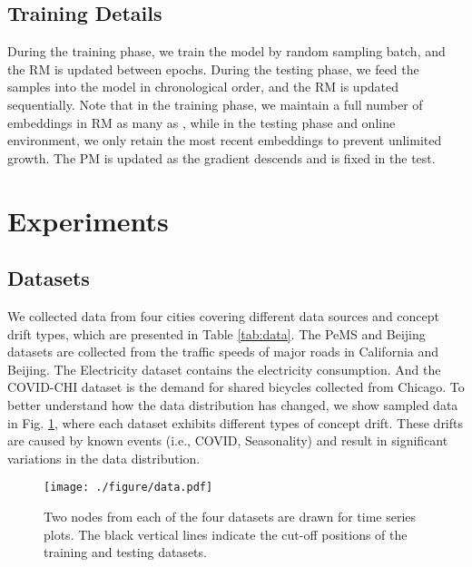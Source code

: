 \documentclass[sigconf]{acmart}
\begin{document}
\subsection{Training Details}
During the training phase, we train the model by random sampling batch, and the RM is updated between epochs. During the testing phase, we feed the samples into the model in chronological order, and the RM is updated sequentially. Note that in the training phase, we maintain a full number of embeddings in RM as many as , while in the testing phase and online environment, we only retain the most recent  embeddings to prevent unlimited growth. The PM is updated as the gradient descends and is fixed in the test.

\section{Experiments}

\begin{table}[h]
    \centering
	\caption{Summary of Experimental Datasets}
	\label{tab:data}
\end{table}

\subsection{Datasets}
We collected data from four cities covering different data sources and concept drift types, which are presented in Table \ref{tab:data}. The PeMS and Beijing datasets are collected from the traffic speeds of major roads in California and Beijing. The Electricity dataset contains the electricity consumption. And the COVID-CHI \cite{wang2022event} dataset is the demand for shared bicycles collected from Chicago. To better understand how the data distribution has changed, we show sampled data in Fig. \ref{fig:data}, where each dataset exhibits different types of concept drift. These drifts are caused by known events (i.e., COVID, Seasonality) and result in significant variations in the data distribution.
\begin{figure}[h]
	\centering
	\texttt{[image: ./figure/data.pdf]}
	\caption{Two nodes from each of the four datasets are drawn for time series plots. The black vertical lines indicate the cut-off positions of the training and testing datasets.}
	\label{fig:data}
\end{figure}
\end{document}
